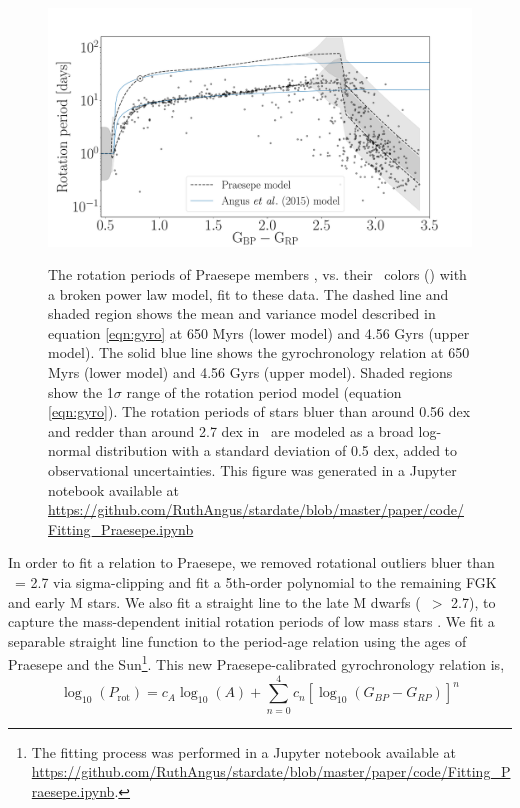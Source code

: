 \begin{figure}
  \caption{
    The rotation periods of Praesepe members \citep{douglas2016},
    vs. their \Gaia\ colors (\gcolor) with a broken power law model, fit to
    these data.
    The dashed line and shaded region shows the mean and variance model
    described in equation \ref{eqn:gyro} at 650 Myrs (lower model) and 4.56
    Gyrs (upper model).
    The solid blue line shows the \citep{angus2015} gyrochronology relation at
    650 Myrs (lower model) and 4.56 Gyrs (upper model).
    Shaded regions show the 1$\sigma$ range of the rotation period
    model (equation \ref{eqn:gyro}).
    The rotation periods of stars bluer than around 0.56 dex and redder than
    around 2.7 dex in \gcolor\ are modeled as a broad log-normal distribution
    with a standard deviation of 0.5 dex, added to observational
    uncertainties.
    This figure was generated in a Jupyter notebook available at
    \url{https://github.com/RuthAngus/stardate/blob/master/paper/code/Fitting_Praesepe.ipynb}
}
  \centering
    \includegraphics[width=1.1\textwidth]{Praesepe.pdf}
\label{fig:praesepe}
\end{figure}
In order to fit a relation to Praesepe, we removed rotational outliers bluer
than \gcolor\ = 2.7 via sigma-clipping and fit a 5th-order polynomial to the
remaining FGK and early M stars.
We also fit a straight line to the late M dwarfs (\gcolor\ $>$ 2.7), to
capture the mass-dependent initial rotation periods of low mass stars
\citep{somers2017}.
We fit a separable straight line function to the period-age relation using
the ages of Praesepe and the Sun\footnote{The fitting process was
performed in a Jupyter notebook available at
\url{https://github.com/RuthAngus/stardate/blob/master/paper/code/Fitting_Praesepe.ipynb}.}.
This new Praesepe-calibrated gyrochronology relation is,
\begin{equation}
    \log_{10}(P_\mathrm{rot}) =
    c_A\log_{10}(A) +
    \sum_{n=0}^4 c_n[\log_{10}(G_{BP}-G_{RP})]^n
\label{eqn:fgk_gyro}
\end{equation}
